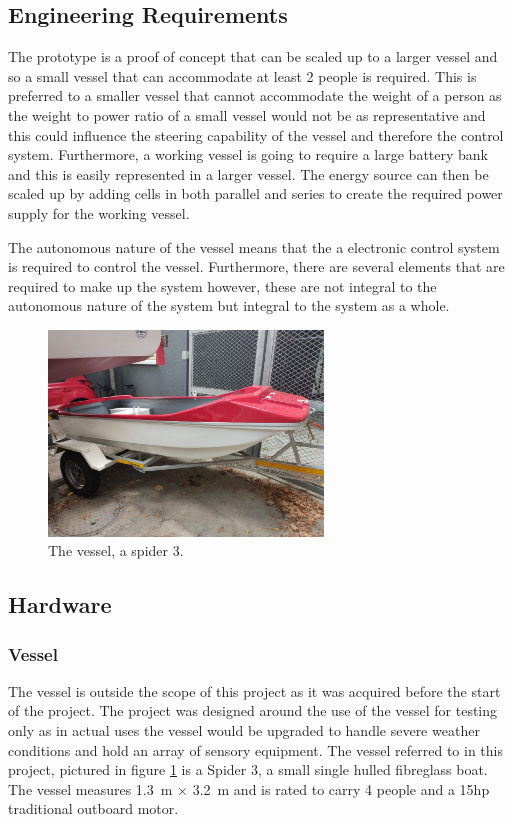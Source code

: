 	\subsection{Engineering Requirements}
	The prototype is a proof of concept that can be scaled up to a larger vessel and so a small vessel that can accommodate at least 2 people is required. This is preferred to a smaller vessel that cannot accommodate the weight of a person as the weight to power ratio of a small vessel would not be as representative and this could influence the steering capability of the vessel and therefore the control system.
	Furthermore, a working vessel is going to require a large battery bank and this is easily represented in a larger vessel. The energy source can then be scaled up by adding cells in both parallel and series to create the required power supply for the working vessel.\par
	The autonomous nature of the vessel means that the a electronic control system is required to control the vessel. Furthermore, there are several elements that are required to make up the system however, these are not integral to the autonomous nature of the system but integral to the system as a whole. %
\begin{figure}
	\begin{center}
		\includegraphics[width = 0.65\textwidth]{figures/spider3.jpg}
		\caption{The vessel, a spider 3.}
		\label{fig:3:spider}
	\end{center}
\end{figure}
	\subsection{Hardware}\par
		\subsubsection{Vessel}
		The vessel is outside the scope of this project as it was acquired before the start of the project. The project was designed around the use of the vessel for testing only as in actual uses the vessel would be upgraded to handle severe weather conditions and hold an array of sensory equipment. The vessel referred to in this project, pictured in figure \ref{fig:3:spider} is a Spider 3, a small single hulled fibreglass boat. The vessel measures \SI{1.3}{\meter} $\times$ \SI{3.2}{\meter} and is rated to carry 4 people and a 15hp traditional outboard motor.\par
